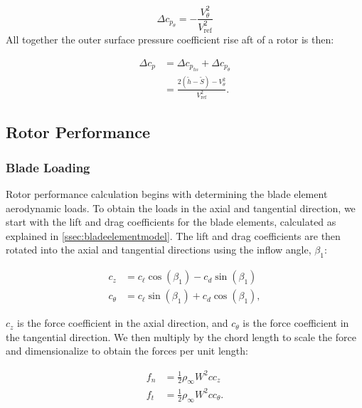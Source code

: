 \begin{equation}
    \Delta c_{p_\theta} = -\frac{V_\theta^2}{V_\text{ref}^2}
\end{equation}
%
All together the outer surface pressure coefficient rise aft of a rotor is then:

\begin{equation}
    \begin{aligned}
        \Delta c_p &= \Delta c_{p_{hs}} + \Delta c_{p_\theta} \\
     &= \frac{2 (\widetilde{h} - \widetilde{S}) - V_\theta^2}{V_\text{ref}^2}.
    \end{aligned}
\end{equation}

\subsection{Rotor Performance}
\label{ssec:rotorperformance}

\subsubsection{Blade Loading}

Rotor performance calculation begins with determining the blade element aerodynamic loads.
%
To obtain the loads in the axial and tangential direction, we start with the lift and drag coefficients for the blade elements, calculated as explained in \cref{ssec:bladeelementmodel}.
%
The lift and drag coefficients are then rotated into the axial and tangential directions using the inflow angle, \(\beta_1\):

\begin{align}
    c_z &= c_\ell \cos(\beta_1) - c_d \sin(\beta_1) \\
    c_\theta &= c_\ell \sin(\beta_1) + c_d \cos(\beta_1),
\end{align}

\where \(c_z\) is the force coefficient in the axial direction, and \(c_\theta\) is the force coefficient in the tangential direction.
%
We then multiply by the chord length to scale the force and dimensionalize to obtain the forces per unit length:

\begin{align}
    f_n &= \frac{1}{2} \rho_\infty W^2 c c_z \\
    f_t &= \frac{1}{2} \rho_\infty W^2 c c_\theta.
\end{align}


